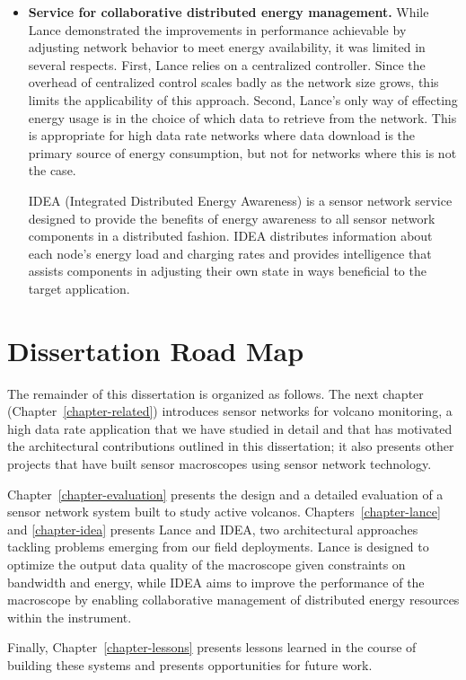 \begin{itemize}
\item \textbf{Service for collaborative distributed energy management.} While
Lance demonstrated the improvements in performance achievable by adjusting
network behavior to meet energy availability, it was limited in several
respects. First, Lance relies on a centralized controller. Since the overhead
of centralized control scales badly as the network size grows, this limits
the applicability of this approach. Second, Lance's only way of effecting
energy usage is in the choice of which data to retrieve from the network. This
is appropriate for high data rate networks where data download is the primary
source of energy consumption, but not for networks where this is not the
case.

IDEA (Integrated Distributed Energy Awareness) is a sensor network service
designed to provide the benefits of energy awareness to all sensor network
components in a distributed fashion. IDEA distributes information about each
node's energy load and charging rates and provides intelligence that assists
components in adjusting their own state in ways beneficial to the target
application.

\end{itemize}

\section{Dissertation Road Map}

The remainder of this dissertation is organized as follows. The next chapter
(Chapter~\ref{chapter-related}) introduces sensor networks for volcano
monitoring, a high data rate application that we have studied in detail and
that has motivated the architectural contributions outlined in this
dissertation; it also presents other projects that have built sensor
macroscopes using sensor network technology.

Chapter~\ref{chapter-evaluation} presents the design and a detailed
evaluation of a sensor network system built to study active volcanos.
Chapters~\ref{chapter-lance} and \ref{chapter-idea} presents Lance and IDEA,
two architectural approaches tackling problems emerging from our field
deployments. Lance is designed to optimize the output data quality of the
macroscope given constraints on bandwidth and energy, while IDEA aims to
improve the performance of the macroscope by enabling collaborative
management of distributed energy resources within the instrument.

Finally, Chapter~\ref{chapter-lessons} presents lessons learned in the course
of building these systems and presents opportunities for future work.
